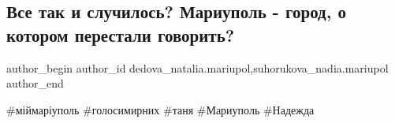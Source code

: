  
 
 
 
 

\subsection{Все так и случилось? Мариуполь - город, о котором перестали говорить?}
\label{sec:28_01_2023.fb.dedova_natalia.mariupol.1.vse_tak_i_sluchilos_}
 
\ifcmt
 author_begin
   author_id dedova_natalia.mariupol,suhorukova_nadia.mariupol
 author_end
\fi

\#міймаріуполь
\#голосимирних
\#таня
\#Мариуполь \#Надежда

